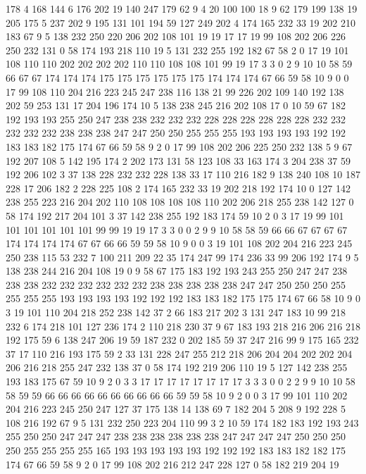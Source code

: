 178 4 168 144 6 176 202 19 140 247 179 62 9 4 20 100 100 18 9 62
179 199 138 19 205 175 5 237 202 9 195 131 101 194 59 127 249 202 4 174
165 232 33 19 202 210 183 67 9 5 138 232 250 220 206 202 108 101 19 19
17 17 19 99 108 202 206 226 250 232 131 0 58 174 193 218 110 19 5 131
232 255 192 182 67 58 2 0 17 19 101 108 110 110 202 202 202 202 110 110
108 108 101 99 19 17 3 3 0 2 9 10 10 58 59 66 67 67 174 174
174 175 175 175 175 175 175 174 174 174 67 66 59 58 10 9 0 0 17 99
108 110 204 216 223 245 247 238 116 138 21 99 226 202 109 140 192 138 202 59
253 131 17 204 196 174 10 5 138 238 245 216 202 108 17 0 10 59 67 182
192 193 193 255 250 247 238 238 232 232 232 228 228 228 228 228 228 232 232 232
232 232 238 238 238 247 247 250 250 255 255 255 193 193 193 193 192 192 183 183
182 175 174 67 66 59 58 9 2 0 17 99 108 202 206 225 250 232 138 5
9 67 192 207 108 5 142 195 174 2 202 173 131 58 123 108 33 163 174 3
204 238 37 59 192 206 102 3 37 138 228 232 232 228 138 33 17 110 216 182
9 138 240 108 10 187 228 17 206 182 2 228 225 108 2 174 165 232 33 19
202 218 192 174 10 0 127 142 238 255 223 216 204 202 110 108 108 108 108 110
202 206 218 255 238 142 127 0 58 174 192 217 204 101 3 37 142 238 255 192
183 174 59 10 2 0 3 17 19 99 101 101 101 101 101 101 99 99 19 19
17 3 3 0 0 2 9 9 10 58 58 59 66 66 67 67 67 67 174 174
174 174 67 67 66 66 59 59 58 10 9 0 0 3 19 101 108 202 204 216
223 245 250 238 115 53 232 7 100 211 209 22 35 174 247 99 174 236 33 99
206 192 174 9 5 138 238 244 216 204 108 19 0 9 58 67 175 183 192 193
243 255 250 247 247 238 238 238 232 232 232 232 232 232 238 238 238 238 238 247
247 250 250 250 255 255 255 255 193 193 193 193 192 192 192 183 183 182 175 175
174 67 66 58 10 9 0 3 19 101 110 204 218 252 238 142 37 2 66 183
217 202 3 131 247 183 10 99 218 232 6 174 218 101 127 236 174 2 110 218
230 37 9 67 183 193 218 216 206 216 218 192 175 59 6 138 247 206 19 59
187 232 0 202 185 59 37 247 216 99 9 175 165 232 37 17 110 216 193 175
59 2 33 131 228 247 255 212 218 206 204 204 202 202 204 206 216 218 255 247
232 138 37 0 58 174 192 219 206 110 19 5 127 142 238 255 193 183 175 67
59 10 9 2 0 3 3 17 17 17 17 17 17 17 17 3 3 3 0 0
2 2 9 9 10 10 58 58 59 59 66 66 66 66 66 66 66 66 66 66
59 59 58 10 9 2 0 0 3 17 99 101 110 202 204 216 223 245 250 247
127 37 175 138 14 138 69 7 182 204 5 208 9 192 228 5 108 216 192 67
9 5 131 232 250 223 204 110 99 3 2 10 59 174 182 183 192 193 243 255
250 250 247 247 247 238 238 238 238 238 238 247 247 247 247 250 250 250 250 255
255 255 255 165 193 193 193 193 193 192 192 192 183 183 182 182 175 174 67 66
59 58 9 2 0 17 99 108 202 216 212 247 228 127 0 58 182 219 204 19
